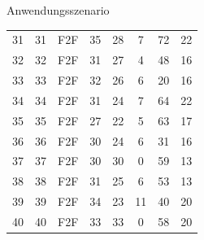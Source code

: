 \documentclass[
  8pt,
  ignorenonframetext,
]{beamer}
\begin{document}
\begin{frame}[fragile]{Anwendungsszenario}
\begin{longtable}[]{@{}cccccccc@{}}
31 & 31 & F2F & 35 & 28 & 7 & 72 & 22 \\
32 & 32 & F2F & 31 & 27 & 4 & 48 & 16 \\
33 & 33 & F2F & 32 & 26 & 6 & 20 & 16 \\
34 & 34 & F2F & 31 & 24 & 7 & 64 & 22 \\
35 & 35 & F2F & 27 & 22 & 5 & 63 & 17 \\
36 & 36 & F2F & 30 & 24 & 6 & 31 & 16 \\
37 & 37 & F2F & 30 & 30 & 0 & 59 & 13 \\
38 & 38 & F2F & 31 & 25 & 6 & 53 & 13 \\
39 & 39 & F2F & 34 & 23 & 11 & 40 & 20 \\
40 & 40 & F2F & 33 & 33 & 0 & 58 & 20 \\
\bottomrule
\end{longtable}
\end{frame}
\end{document}
